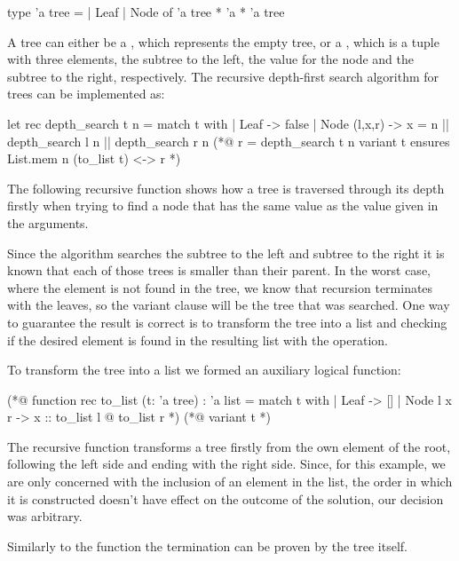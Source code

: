 \begin{gospell}
type 'a tree =
    | Leaf
    | Node of 'a tree * 'a * 'a tree
\end{gospell}

A tree can either be a , which represents the empty tree, or a , which is a tuple with three elements, 
the subtree to the left, the value for the node and the subtree to the right, respectively. The recursive depth-first search algorithm 
for trees can be implemented as:

\begin{gospell}
let rec depth_search t n = 
  match t with
  | Leaf -> false
  | Node (l,x,r) -> x = n || depth_search l n || depth_search r n
(*@
  r = depth_search t n
  variant t
  ensures List.mem n (to_list t) <-> r
*)
\end{gospell}

The following recursive function  shows how a tree is traversed through its depth firstly when trying to find
a node that has the same value as the value given in the arguments.

Since the algorithm searches the subtree to the left and subtree to the right it is known that each of those trees is smaller than their
parent. In the worst case, where the element is not found in the tree, we know that recursion terminates with the leaves, so the variant 
clause will be the tree that was searched. One way to guarantee the result is correct is to transform the tree into a list and checking if
the desired element is found in the resulting list with the  operation.

To transform the tree into a list we formed an auxiliary logical function:

\begin{gospell}
(*@ function rec to_list (t: 'a tree) : 'a list = 
  match t with
  | Leaf -> []
  | Node l x r -> x :: to_list l @ to_list r
*)
(*@
  variant t
*)
\end{gospell}

The recursive function  transforms a tree firstly from the own element of the root, following the left side and 
ending with the right side. Since, for this example, we are only concerned with the inclusion of an element in the list, the order 
in which it is constructed doesn't have effect on the outcome of the solution, our decision was arbitrary.

Similarly to the function  the termination can be proven by the tree itself.

